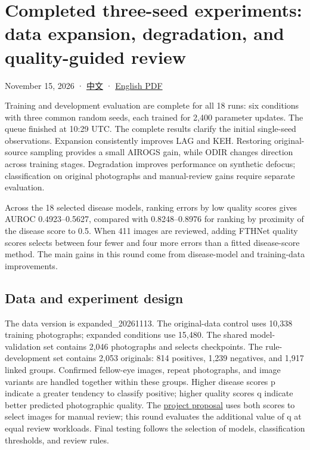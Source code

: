 \documentclass[
  10pt,
]{article}
\author{}
\date{}
\begin{document}
\section{Completed three-seed experiments: data expansion, degradation,
and quality-guided
review}\label{completed-three-seed-experiments-data-expansion-degradation-and-quality-guided-review}

November 15, 2026 · \href{completed-results.zh.md}{中文} ·
\href{completed-results.en.pdf}{English PDF}

Training and development evaluation are complete for all 18 runs: six
conditions with three common random seeds, each trained for 2,400
parameter updates. The queue finished at 10:29 UTC. The complete results
clarify the initial single-seed observations. Expansion consistently
improves LAG and KEH. Restoring original-source sampling provides a
small AIROGS gain, while ODIR changes direction across training stages.
Degradation improves performance on synthetic defocus; classification on
original photographs and manual-review gains require separate
evaluation.

Across the 18 selected disease models, ranking errors by low quality
scores gives AUROC 0.4923--0.5627, compared with 0.8248--0.8976 for
ranking by proximity of the disease score to 0.5. When 411 images are
reviewed, adding FTHNet quality scores selects between four fewer and
four more errors than a fitted disease-score method. The main gains in
this round come from disease-model and training-data improvements.

\subsection{Data and experiment
design}\label{data-and-experiment-design}

The data version is expanded\_20261113. The original-data control uses
10,338 training photographs; expanded conditions use 15,480. The shared
model-validation set contains 2,046 photographs and selects checkpoints.
The rule-development set contains 2,053 originals: 814 positives, 1,239
negatives, and 1,917 linked groups. Confirmed fellow-eye images, repeat
photographs, and image variants are handled together within these
groups. Higher disease scores p indicate a greater tendency to classify
positive; higher quality scores q indicate better predicted photographic
quality. The \href{../../../../proposal-1106.pdf}{project proposal} uses
both scores to select images for manual review; this round evaluates the
additional value of q at equal review workloads. Final testing follows
the selection of models, classification thresholds, and review rules.
\end{document}
